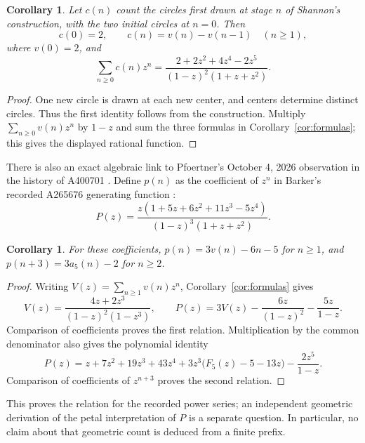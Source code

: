 \documentclass[11pt]{article}
\newtheorem{corollary}[theorem]{Corollary}
\begin{document}
\begin{corollary}\label{cor:circles}
Let $c(n)$ count the circles first drawn at stage $n$ of Shannon's
construction, with the two initial circles at $n=0$. Then
\[
 c(0)=2,\qquad c(n)=v(n)-v(n-1)\quad(n\geq1),
\]
where $v(0)=2$, and
\[
 \sum_{n\geq0}c(n)z^n=
 \frac{2+2z^2+4z^4-2z^5}{(1-z)^2(1+z+z^2)}.
\]
\end{corollary}
\begin{proof}
One new circle is drawn at each new center, and centers determine distinct
circles. Thus the first identity follows from the construction. Multiply
$\sum_{n\geq0}v(n)z^n$ by $1-z$ and sum the three formulas in
Corollary~\ref{cor:formulas}; this gives the displayed rational function.
\end{proof}

There is also an exact algebraic link to Pfoertner's October 4, 2026
observation in the history of A400701 \cite{markey}. Define $p(n)$ as the
coefficient of $z^n$ in Barker's recorded A265676 generating function
\cite{petals}:
\[
 P(z)=\frac{z(1+5z+6z^2+11z^3-5z^4)}{(1-z)^3(1+z+z^2)}.
\]
\begin{corollary}\label{cor:petal}
For these coefficients,
$p(n)=3v(n)-6n-5$ for $n\geq1$, and
$p(n+3)=3a_5(n)-2$ for $n\geq2$.
\end{corollary}
\begin{proof}
Writing $V(z)=\sum_{n\geq1}v(n)z^n$, Corollary~\ref{cor:formulas} gives
\[
 V(z)=\frac{4z+2z^3}{(1-z)^2(1-z^3)},\qquad
 P(z)=3V(z)-\frac{6z}{(1-z)^2}-\frac{5z}{1-z}.
\]
Comparison of coefficients proves the first relation.
Multiplication by the common denominator also gives the polynomial identity
\[
 P(z)=z+7z^2+19z^3+43z^4+
 3z^3\bigl(F_5(z)-5-13z\bigr)-\frac{2z^5}{1-z}.
\]
Comparison of coefficients of $z^{n+3}$ proves the second relation.
\end{proof}
This proves the relation for the recorded power series; an independent
geometric derivation of the petal interpretation of $P$ is a separate
question. In particular, no claim about that geometric count is deduced
from a finite prefix.
\end{document}
